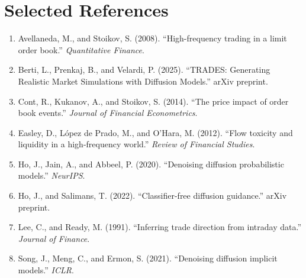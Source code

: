 \documentclass[10pt,letterpaper,twocolumn]{article}
\begin{document}
\section{Selected References}

\begin{enumerate}[leftmargin=1.2em,itemsep=0.2em]
\item Avellaneda, M., and Stoikov, S. (2008). ``High-frequency trading in a limit order book.'' \emph{Quantitative Finance}.
\item Berti, L., Prenkaj, B., and Velardi, P. (2025). ``TRADES: Generating Realistic Market Simulations with Diffusion Models.'' arXiv preprint.
\item Cont, R., Kukanov, A., and Stoikov, S. (2014). ``The price impact of order book events.'' \emph{Journal of Financial Econometrics}.
\item Easley, D., L\'opez de Prado, M., and O'Hara, M. (2012). ``Flow toxicity and liquidity in a high-frequency world.'' \emph{Review of Financial Studies}.
\item Ho, J., Jain, A., and Abbeel, P. (2020). ``Denoising diffusion probabilistic models.'' \emph{NeurIPS}.
\item Ho, J., and Salimans, T. (2022). ``Classifier-free diffusion guidance.'' arXiv preprint.
\item Lee, C., and Ready, M. (1991). ``Inferring trade direction from intraday data.'' \emph{Journal of Finance}.
\item Song, J., Meng, C., and Ermon, S. (2021). ``Denoising diffusion implicit models.'' \emph{ICLR}.
\end{enumerate}
\end{document}
